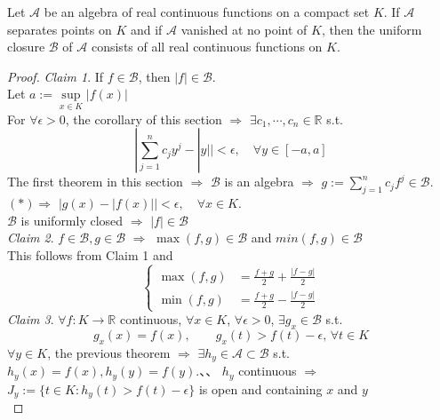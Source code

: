 \begin{theorem}
    Let  $ \mathscr{A} $ be an algebra of real continuous functions on a compact set  $ K  $. If  $  \mathscr{A} $ separates points on  $ K  $ and if  $  \mathscr{A } $ vanished at no point of  $ K  $, then the uniform closure  $  \mathscr{B } $ of  $  \mathscr{A } $ consists of all real continuous functions on  $ K $.
\end{theorem}
\begin{proof}
    \textit{Claim 1}. If  $ f\in  \mathscr{B } $, then  $ |f|\in  \mathscr{B } $.\\
    Let  $ a:=\sup\limits_{x\in K }|f(x)| $\\
    For  $ \forall \epsilon>0  $, the corollary  of this section  $ \Rightarrow  $  $ \exists c_1,\cdots,c_n\in \mathbb{R } $ s.t.
    \begin{equation}
        |\sum\limits_{j=1 }^{n } c_j y^j-|y||<\epsilon,\quad\forall y\in [-a,a]\tag{ $ \ast $ }
    \end{equation} 
    The first theorem in this section  $ \Rightarrow  $  $  \mathscr{B } $ is an algebra  $ \Rightarrow  $  $ g:=\sum\limits_{j=1 }^{n } c_jf^j\in  \mathscr{B } $.\\
     $ (\ast)\Rightarrow $ $ |g(x)-|f(x)||<\epsilon,\quad\forall x\in K  $.\\
      $  \mathscr{B } $ is uniformly closed  $ \Rightarrow  $  $ |f|\in  \mathscr{B } $\\
    \textit{Claim 2}.  $ f\in  \mathscr{B },g\in  \mathscr{B } $  $ \Rightarrow  $  $ \max(f,g)\in  \mathscr{B } $ and  $ min(f,g)\in  \mathscr{B } $\\ 
      This follows from Claim 1 and 
      \[\left\{
    \begin{aligned}
        \max(f,g)&=\frac{f+g}{2}+\frac{|f-g|}{2 }\\
        \min(f,g)&=\frac{f+g}{2}-\frac{|f-g|}{2 }
    \end{aligned}
      \right.\] 
    \textit{Claim 3}.  $ \forall f:K\rightarrow \mathbb{R }  $ continuous,  $ \forall x\in K  $,  $ \forall \epsilon>0  $,  $ \exists g_x\in  \mathscr{B } $ s.t.
    \[g_x(x)=f(x),\qquad g_x(t)>f(t)-\epsilon,\,\forall t\in K\]
     $ \forall y\in K  $, the previous theorem  $ \Rightarrow  $  $ \exists h_y\in  \mathscr{A }\subset  \mathscr{B } $ s.t.  $ h_y(x)=f(x),h_y(y)=f(y) $.、、
      $ h_y $ continuous  $ \Rightarrow  $  $ J_y:=\{t\in K: h_y(t)>f(t)-\epsilon\} $ is open and containing  $ x  $ and  $ y $ \\

\end{proof}
